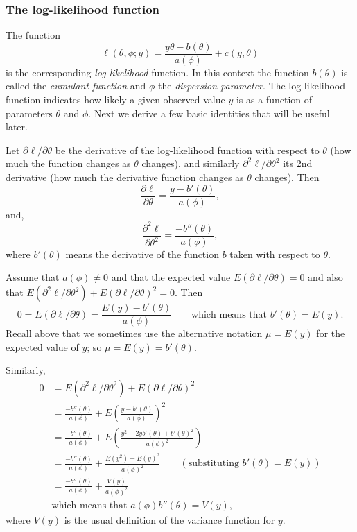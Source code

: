 \documentclass[10pt]{article} %
\begin{document}
\subsubsection*{The log-likelihood function}
The function
\begin{equation}\label{loglik}
\ell(\theta, \phi; y) = \frac{y\theta - b(\theta)}{a(\phi)} + c(y, \theta)
\end{equation}
is the corresponding \emph{log-likelihood} function. In this context the
function $b(\theta)$ is called the \emph{cumulant function} and $\phi$
the \emph{dispersion parameter}. The log-likelihood function
indicates how likely a given observed value $y$ is as a function
of parameters $\theta$ and $\phi$.  Next we derive a few basic identities that
will be useful later.

Let $\partial\ell/\partial\theta$ be the derivative of the log-likelihood
function with respect to $\theta$ (how much the function changes as
$\theta$ changes), and similarly $\partial^2\ell/\partial\theta^2$
its 2nd derivative (how much the derivative function changes as
$\theta$ changes). Then
\begin{equation}\label{dl}
\frac{\partial\ell}{\partial\theta} = \frac{y - b'(\theta)}{a(\phi)},
\end{equation}
and,
\begin{equation}\label{d2l}
\frac{\partial^2\ell}{\partial\theta^2} = \frac{-b''(\theta)}{a(\phi)},
\end{equation}
where $b'(\theta)$ means the derivative of the function $b$ taken with
respect to $\theta$.

Assume that $a(\phi)\ne 0$ and that 
the expected value $E(\partial\ell/\partial\theta) = 0$
and also that
$E(\partial^2\ell/\partial\theta^2) + E(\partial\ell/\partial\theta)^2 = 0$.
Then
\begin{equation}\label{bprime}
0 = E(\partial\ell/\partial\theta)  = \frac{E(y) - b'(\theta)}{a(\phi)}
\qquad\mbox{which means that}\,\,b'(\theta) = E(y).
\end{equation}
Recall above that we sometimes use the alternative notation $\mu=E(y)$
for the expected value of $y$; so $\mu=E(y)=b'(\theta)$.

Similarly,
\begin{align}
0 &= 
E(\partial^2\ell/\partial\theta^2) + E(\partial\ell/\partial\theta)^2 \nonumber\\
&=
\frac{-b''(\theta)}{a(\phi)} +
E\left(\frac{y - b'(\theta)}{a(\phi)}\right)^2 \nonumber\\
&= \frac{-b''(\theta)}{a(\phi)} +
E\left(\frac{y^2 - 2yb'(\theta) + b'(\theta)^2}{a(\phi)^2}\right)\nonumber\\
&= \frac{-b''(\theta)}{a(\phi)} +
\frac{E(y^2) - E(y)^2}{a(\phi)^2} \qquad(\mbox{substituting}\,\,b'(\theta)=E(y))\nonumber\\
&= \frac{-b''(\theta)}{a(\phi)} + \frac{V(y)}{a(\phi)^2}\nonumber\\
&\mbox{which means that}\,\,a(\phi)b''(\theta) = V(y)\label{b2},
\end{align}
where $V(y)$ is the usual definition of the variance function for $y$.
\end{document}
